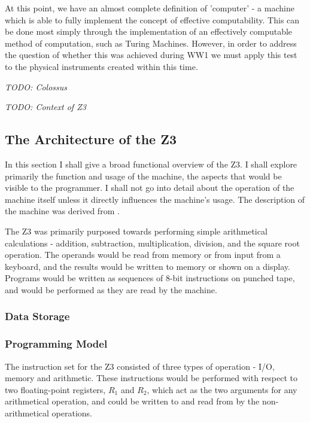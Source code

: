 \documentclass[Master.tex]{subfiles}
\begin{document}
At this point, we have an almost complete definition of 'computer' - a machine which is able to fully implement the concept of effective computability. This can be done most simply through the implementation of an effectively computable method of computation, such as Turing Machines. However, in order to address the question of whether this was achieved during WW1 we must apply this test to the physical instruments created within this time.

\textit{TODO: Colossus}

\textit{TODO: Context of Z3}

\subsection{The Architecture of the Z3}

In this section I shall give a broad functional overview of the Z3. I shall explore primarily the function and usage of the machine, the aspects that would be visible to the programmer. I shall not go into detail about the operation of the machine itself unless it directly influences the machine's usage. The description of the machine was derived from \cite{rojas1997z3architecture}.

The Z3 was primarily purposed towards performing simple arithmetical calculations - addition, subtraction, multiplication, division, and the square root operation. The operands would be read from memory or from input from a keyboard, and the results would be written to memory or shown on a display. Programs would be written as sequences of 8-bit instructions on punched tape, and would be performed as they are read by the machine.

\subsubsection{Data Storage}



\subsubsection{Programming Model}

The instruction set for the Z3 consisted of three types of operation - I/O, memory and arithmetic. These instructions would be performed with respect to two floating-point registers, $R_1$ and $R_2$, which act as the two arguments for any arithmetical operation, and could be written to and read from by the non-arithmetical operations. 
\end{document}
